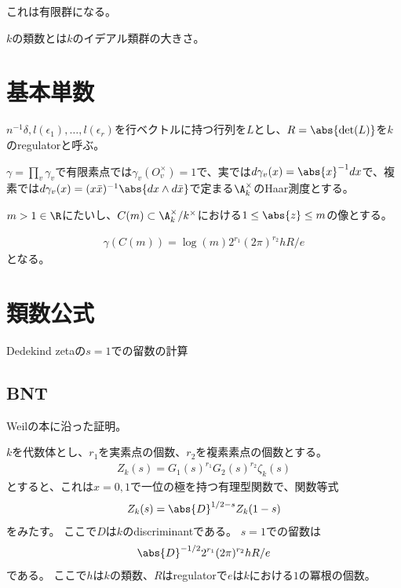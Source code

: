 \documentclass{jsarticle}
\begin{document}
これは有限群になる。

$k$の類数とは$k$のイデアル類群の大きさ。

\section{基本単数}

\begin{dfn}[Definition 7, p.94]
$n^{-1}\delta, l(\epsilon_1),\ldots,l(\epsilon_r)$を行ベクトルに持つ行列を$L$とし、$R=\abs{\det(L)}$を$k$のregulatorと呼ぶ。
\end{dfn}

\begin{prop}[Proposition 9, p.95]
$\gamma=\prod_v\gamma_v$で有限素点では$\gamma_v(O_v^\times)=1$で、実では$d\gamma_v(x)=\abs{x}^{-1}dx$で、複素では$d\gamma_v(x)=(x\bar{x})^{-1}\abs{dx\wedge d\bar{x}}$で定まる$\A_k^\times$のHaar測度とする。

$m>1 \in \R$にたいし、$C(m) \subset \A_k^\times / k^\times$における$1\leq \abs{z}\leq m$の像とする。

\begin{align*}
\gamma(C(m)) = \log(m)2^{r_1}(2\pi)^{r_2}hR/e
\end{align*}
となる。
\end{prop}
\section{類数公式}
Dedekind zetaの$s=1$での留数の計算

\subsection{BNT}
Weilの本に沿った証明。

\begin{thm}[Theoerm 3, p.129]
$k$を代数体とし、$r_1$を実素点の個数、$r_2$を複素素点の個数とする。
\begin{align*}
Z_k(s)=G_1(s)^{r_1}G_2(s)^{r_2}\zeta_k(s)
\end{align*}
とすると、これは$x=0, 1$で一位の極を持つ有理型関数で、関数等式
\begin{align*}
Z_k(s)=\abs{D}^{1/2-s}Z_k(1-s)
\end{align*}
をみたす。
ここで$D$は$k$のdiscriminantである。
$s=1$での留数は
\begin{align*}
\abs{D}^{-1/2}2^{r_1}(2\pi)^{r_2}hR/e
\end{align*}
である。
ここで$h$は$k$の類数、$R$はregulatorで$e$は$k$における$1$の冪根の個数。
\end{thm}
\end{document}
